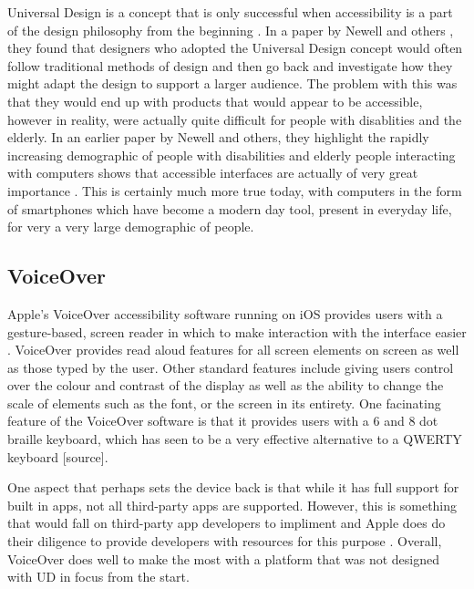 Universal Design is a concept that is only successful when accessibility is a part of the design philosophy from the beginning \cite{incldesign}.
In a paper by Newell and others \cite{incldesign}, they found that designers who adopted the Universal Design concept would often follow traditional methods of design and then go back and investigate how they might adapt the design to support a larger audience.
The problem with this was that they would end up with products that would appear to be accessible, however in reality, were actually quite difficult for people with disablities and the elderly.
In an earlier paper by Newell and others, they highlight the rapidly increasing demographic of people with disabilities and elderly people interacting with computers shows that accessible interfaces are actually of very great importance \cite{computerinterface}.
This is certainly much more true today, with computers in the form of smartphones which have become a modern day tool, present in everyday life, for very a very large demographic of people.


\subsection{VoiceOver}
Apple's VoiceOver accessibility software running on iOS provides users with a gesture-based, screen reader in which to make interaction with the interface easier \cite{iphone}.
VoiceOver provides read aloud features for all screen elements on screen as well as those typed by the user.
Other standard features include giving users control over the colour and contrast of the display as well as the ability to change the scale of elements such as the font, or the screen in its entirety.
One facinating feature of the VoiceOver software is that it provides users with a 6 and 8 dot braille keyboard, which has seen to be a very effective alternative to a QWERTY keyboard [source]. %

One aspect that perhaps sets the device back is that while it has full support for built in apps, not all third-party apps are supported.
However, this is something that would fall on third-party app developers to impliment and Apple does do their diligence to provide developers with resources for this purpose \cite{iphonedev}.
Overall, VoiceOver does well to make the most with a platform that was not designed with UD in focus from the start.

